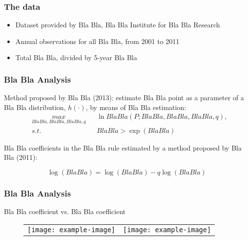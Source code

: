 \documentclass{beamer}
\begin{document}
\begin{frame}
\frametitle{The data}
\begin{itemize}
\item Dataset provided by Bla Bla, Bla Bla Institute for Bla Bla Research
\item Annual observations for all Bla Bla, from 2001 to 2011
\item Total Bla Bla, divided by 5-year Bla Bla
\end{itemize}
\end{frame}

\begin{frame}
\frametitle{Bla Bla Analysis}
Method proposed by Bla Bla (2013): estimate Bla Bla point as a parameter of a Bla Bla distribution, $h(\cdot)$, by means of Bla Bla estimation:\\

\begin{equation*}
\begin{aligned}
& \underset{Bla Bla,Bla Bla,Bla Bla,q}{max}
& & \ln Bla Bla(P;Bla Bla,Bla Bla,Bla Bla,q),\\
& s.t. & & Bla Bla > \exp(Bla Bla)
\end{aligned}
\end{equation*}

Bla Bla coefficients in the Bla Bla rule estimated by a method proposed by Bla Bla (2011):

\begin{equation*}
\log(Bla Bla) = \log(Bla Bla)-q\log(Bla Bla)
\end{equation*}
\end{frame}

\begin{frame}
\frametitle{Bla Bla Analysis}
\begin{center}
Bla Bla coefficient vs. Bla Bla coefficient
\end{center}
\begin{figure}
\begin{center}
\begin{tabular}{cc}
\texttt{[image: example-image]} &
\texttt{[image: example-image]}
\end{tabular}
\end{center}
\end{figure}
\end{frame}
\end{document}
